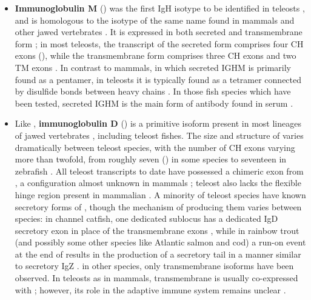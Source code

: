 \begin{itemize}
\item \textbf{Immunoglobulin M} () was the first IgH isotype to be identified in teleosts \parencite{fillatreau2013astonishing}, and is homologous to the isotype of the same name found in mammals and other jawed vertebrates \parencite{mashoof2016immunoglobulins}. It is expressed in both secreted and transmembrane form \parencite{fillatreau2013astonishing}; in most teleosts, the transcript of the secreted form comprises four CH exons (), while the transmembrane form comprises three CH exons and two TM exons \parencite{bengten2015fishantibodies,fillatreau2013astonishing}. In contrast to mammals, in which secreted IGHM is primarily found as a pentamer, in teleosts it is typically found as a tetramer \parencite{fillatreau2013astonishing} connected by disulfide bonds between heavy chains \parencite{mashoof2016immunoglobulins}. In those fish species which have been tested, secreted IGHM is the main form of antibody found in serum \parencite{bengten2015fishantibodies,mashoof2016immunoglobulins,fillatreau2013astonishing}.
\item Like , \textbf{immunoglobulin D} () is a primitive isoform present in most lineages of jawed vertebrates \parencite{mashoof2016immunoglobulins}, including teleost fishes. The size and structure of  varies dramatically between teleost species, with the number of CH exons varying more than twofold, from roughly seven () in some species to seventeen in zebrafish \parencite{mashoof2016immunoglobulins,fillatreau2013astonishing}. All teleost  transcripts to date have possessed a chimeric  exon from , a configuration almost unknown in mammals \parencite{mashoof2016immunoglobulins,fillatreau2013astonishing}; teleost  also lacks the flexible hinge region present in mammalian  \parencite{fillatreau2013astonishing}. A minority of teleost species have known secretory forms of , though the mechanism of producing them varies between species: in channel catfish, one dedicated sublocus has a dedicated IgD secretory exon in place of the transmembrane exons \parencite{bengten2006catfish}, while in rainbow trout (and possibly some other species like Atlantic salmon and cod) a run-on event at the end of  results in the production of a secretory tail in a manner similar to secretory IgZ \parencite{ramirezgomez2012secretoryigd}. in other species, only transmembrane isoforms have been observed. In teleosts as in mammals, transmembrane  is usually co-expressed with ; however, its role in the adaptive immune system remains unclear \parencite{mashoof2016immunoglobulins}.

\end{itemize}
